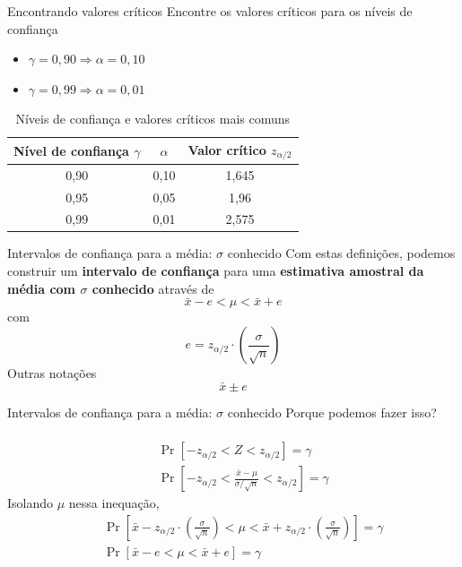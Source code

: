 \documentclass[10pt]{beamer}\usepackage[]{graphicx}\usepackage[]{color}
\theoremstyle{definition}
\begin{document}
\begin{frame}{Encontrando valores críticos}
  Encontre os valores críticos para os níveis de confiança
  \begin{itemize}
  \item $\gamma = 0,90 \Rightarrow \alpha = 0,10$
  \item $\gamma = 0,99 \Rightarrow \alpha = 0,01$
  \end{itemize}
  \begin{table}[h]
    \centering
    \caption{Níveis de confiança e valores críticos mais comuns}
    \begin{tabular}{ccc}
      \hline
      Nível de confiança $\gamma$ & $\alpha$ & Valor crítico
      $z_{\alpha/2}$ \\
      \hline
      0,90 & 0,10 & 1,645 \\
      0,95 & 0,05 & 1,96 \\
      0,99 & 0,01 & 2,575 \\
      \hline
    \end{tabular}
  \end{table}
\end{frame}

\begin{frame}{Intervalos de confiança para a média: $\sigma$ conhecido}
  Com estas definições, podemos construir um \textbf{intervalo de
    confiança} para uma \textbf{estimativa amostral da média com
    $\sigma$ conhecido} através de
  \begin{equation*}
    \bar{x} - e < \mu < \bar{x} + e
  \end{equation*}
  com
  \begin{equation*}
    e = z_{\alpha/2} \cdot \left(\frac{\sigma}{\sqrt{n}}\right)
  \end{equation*}
  Outras notações
  \begin{equation*}
    \bar{x} \pm e
  \end{equation*}
  \begin{equation*}
    [\bar{x} - e; \bar{x} + e]
  \end{equation*}
\end{frame}

\begin{frame}{Intervalos de confiança para a média: $\sigma$ conhecido}
  Porque podemos fazer isso? \\~\\
  \begin{eqnarray*}
    &&\Pr[-z_{\alpha/2} < Z < z_{\alpha/2}] = \gamma \\
    &&\Pr[-z_{\alpha/2} < \frac{\bar{x} - \mu}{\sigma/\sqrt{n}} <
    z_{\alpha/2}] = \gamma
  \end{eqnarray*}
  Isolando $\mu$ nessa inequação,
  \begin{eqnarray*}
    &&\Pr[\bar{x} - z_{\alpha/2} \cdot
    \left(\frac{\sigma}{\sqrt{n}} \right) < \mu < \bar{x} + z_{\alpha/2}
    \cdot \left(\frac{\sigma}{\sqrt{n}} \right)] = \gamma \\
    &&\Pr[\bar{x} - e < \mu < \bar{x} + e] = \gamma \\
  \end{eqnarray*}
\end{frame}
\end{document}
